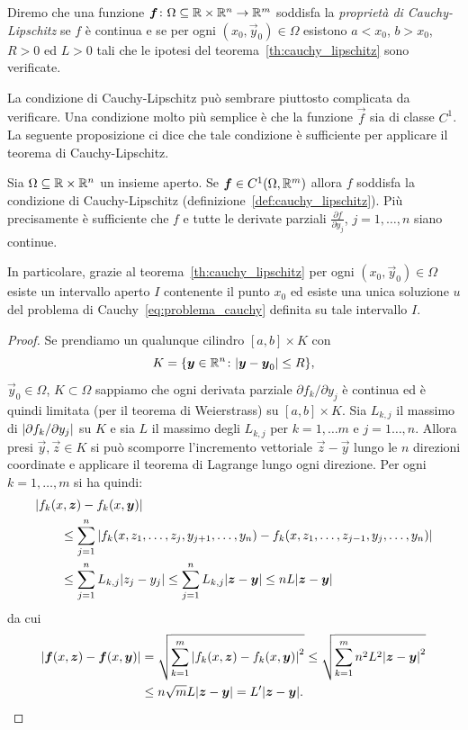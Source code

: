 \begin{definition}%
\label{def:cauchy_lipschitz}%
Diremo che una funzione $\boldsymbol f\colon \Omega\subseteq {\mathbb R}\times {\mathbb R}^n \to {\mathbb R}^m$
soddisfa la \emph{proprietà di Cauchy-Lipschitz}%
 se $f$ è continua e se
per ogni $(x_0,\vec y_0)\in \Omega$ esistono $a<x_0$, $b>x_0$, $R>0$ ed $L>0$
tali che le ipotesi del teorema~\ref{th:cauchy_lipschitz} sono verificate.
\end{definition}
 
La condizione di Cauchy-Lipschitz può sembrare piuttosto complicata
da verificare. Una condizione molto più semplice  è che la funzione $\vec f$
sia di classe $C^1$. La seguente proposizione ci dice che tale
condizione è sufficiente per applicare il teorema di Cauchy-Lipschitz.

\begin{proposition}%
\mymark{***}%
Sia $\Omega \subseteq {\mathbb R}\times {\mathbb R}^n$ un insieme aperto.
Se $\boldsymbol f\in C^1(\Omega,{\mathbb R}^m)$ 
allora $f$ soddisfa la condizione
di Cauchy-Lipschitz (definizione~\ref{def:cauchy_lipschitz}).
Più precisamente è sufficiente che $f$ 
e tutte le derivate parziali $\frac{\partial f}{\partial y_j}$, $j=1,\dots,n$ 
siano continue.

In particolare, grazie al teorema~\ref{th:cauchy_lipschitz} 
per ogni $(x_0,\vec y_0)\in \Omega$ esiste un intervallo aperto 
$I$ contenente il punto $x_0$
ed esiste una unica soluzione $u$ 
del problema di Cauchy~\eqref{eq:problema_cauchy} definita 
su tale intervallo $I$.
\end{proposition}
%
\begin{proof}
\mymark{***}%
Se prendiamo un qualunque cilindro $[a,b]\times K$ con 
\[
  K={\left\{ \boldsymbol y\in {\mathbb R}^n\colon {\left|\boldsymbol y-\boldsymbol y_0\right|}\le R \right\}}, 
\]
$\vec y_0\in \Omega$, $K\subset \Omega$
sappiamo che ogni derivata parziale
$\partial f_k / \partial y_j$ è continua ed è quindi limitata
(per il teorema di Weierstrass) su $[a,b]\times K$. 
Sia $L_{k,j}$ il massimo di ${\left|\partial f_k / \partial y_j\right|}$ su $K$ e sia
$L$ il massimo degli $L_{k,j}$ per $k=1,\dots m$ e $j=1\dots,n$.
Allora presi $\vec y, \vec z\in K$ si può scomporre l'incremento vettoriale 
$\vec z - \vec y$ lungo le $n$ direzioni coordinate e applicare il teorema di Lagrange lungo ogni direzione.
Per ogni $k = 1,\dots, m$ si ha quindi:
\begin{align*}
\MoveEqLeft
\abs{f_k(x,\vec z)-f_k(x,\vec y)}\\
&\le \sum_{j=1}^n \abs{f_k(x,z_1, \dots, z_j, y_{j+1}, \dots, y_n) - f_k(x,z_1, \dots, z_{j-1}, y_j, \dots, y_n)}\\
&\le \sum_{j=1}^n L_{k,j} \abs{z_j-y_j}
\le \sum_{j=1}^n L_{k,j} \abs{\vec z-\vec y}
\le n L \abs{\vec z-\vec y}
\end{align*}
da cui
\begin{align*}
  {\left|\boldsymbol f(x,\boldsymbol z) - \boldsymbol f(x,\boldsymbol y)\right|}
  &= \sqrt{\sum_{k=1}^m {\left|f_k(x,\boldsymbol z) - f_k(x,\boldsymbol y)\right|}^2} 
  \le \sqrt{\sum_{k=1}^m n^2 L^2 {\left|\boldsymbol z-\boldsymbol y\right|}^2} \\
  &\le n\sqrt{m} L {\left|\boldsymbol z-\boldsymbol y\right|} = L' {\left|\boldsymbol z-\boldsymbol y\right|}.
\end{align*}
\end{proof}

